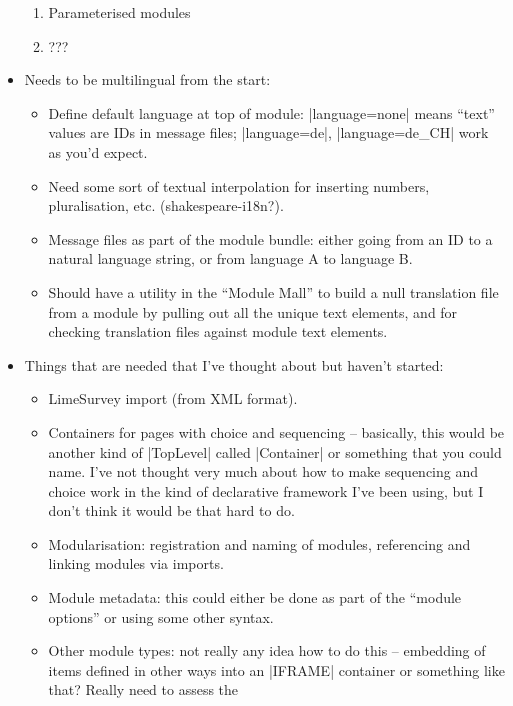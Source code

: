 \documentclass[DIV=calc,paper=a4,fontsize=11pt]{scrartcl}
\begin{document}
\begin{itemize}
{\begin{description}
{\begin{enumerate}
          \item{Parameterised modules}
          \item{???}
        \end{enumerate}}
    \end{description}}
  \item{Needs to be multilingual from the start:
    \begin{itemize}
     \item{Define default language at top of module: |language=none|
       means ``text'' values are IDs in message files; |language=de|,
       |language=de_CH| work as you'd expect.}
     \item{Need some sort of textual interpolation for inserting
       numbers, pluralisation, etc.  (shakespeare-i18n?).}
     \item{Message files as part of the module bundle: either going
       from an ID to a natural language string, or from language A to
       language B.}
     \item{Should have a utility in the ``Module Mall'' to build a
       null translation file from a module by pulling out all the
       unique text elements, and for checking translation files
       against module text elements.}
    \end{itemize}}
  \item{Things that are needed that I've thought about but haven't
    started:
    \begin{itemize}
      \item{LimeSurvey import (from XML format).}
      \item{Containers for pages with choice and sequencing --
        basically, this would be another kind of |TopLevel| called
        |Container| or something that you could name.  I've not
        thought very much about how to make sequencing and choice work
        in the kind of declarative framework I've been using, but I
        don't think it would be that hard to do.}
      \item{Modularisation: registration and naming of modules,
        referencing and linking modules via imports.}
      \item{Module metadata: this could either be done as part of the
        ``module options'' or using some other syntax.}
      \item{Other module types: not really any idea how to do this --
        embedding of items defined in other ways into an |IFRAME|
        container or something like that?  Really need to assess the
}
\end{itemize}}
\end{itemize}
\end{document}
